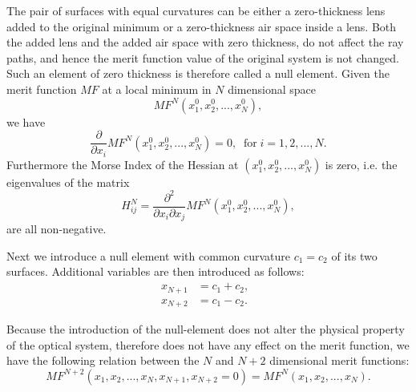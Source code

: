 The pair of surfaces with equal curvatures can be either a zero-thickness lens added to the original minimum or a zero-thickness air space inside a lens. Both the added lens and the added air space with zero thickness, do not affect the ray paths, and hence the merit function value of the original system is not changed. Such an element of zero thickness is therefore called a null element. 
Given the merit function $MF$ at a local minimum in $N$ dimensional space
\begin{equation}
MF^{N}(x^{0}_1, x^{0}_{2},...,x^{0}_{N}),
\end{equation}we have 
\begin{equation}\label{eq_mflm}
\frac{\partial}{\partial{x_i}}MF^{N}(x^{0}_1, x^{0}_{2},...,x^{0}_{N}) = 0, \;\; \text{for} \; i =1,2,...,N.
\end{equation}Furthermore the Morse Index of the Hessian at $(x^{0}_1, x^{0}_{2},...,x^{0}_{N})$ is zero, i.e. the eigenvalues of the matrix
\begin{equation}
H^{N}_{ij}=\frac{\partial^2}{\partial{x_i}\partial{x_j}} MF^{N}(x^{0}_1, x^{0}_{2},...,x^{0}_{N}),
\end{equation}are all non-negative.

Next we introduce a null element with common curvature $c_1=c_2$ of its two surfaces. Additional variables are then introduced as follows:
\begin{equation}
\begin{split}
x_{N+1} &= c_1 + c_2, \;\;\\
x_{N+2} &= c_1 - c_2. \;\;
\end{split}
\end{equation}

Because the introduction of the null-element does not alter the physical property of the optical system, therefore does not have any effect on the merit function, we have the following relation between the $N$ and $N+2$ dimensional merit functions:
\begin{equation} \label{eq_mfconst}
MF^{N+2}(x_1, x_{2},...,x_{N}, x_{N+1},x_{N+2}=0) = MF^{N}(x_1, x_{2},...,x_{N}).
\end{equation}%

